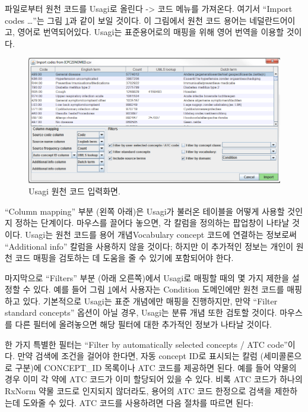 \documentclass[10.5pt]{book}
\theoremstyle{definition}
\theoremstyle{definition}
\theoremstyle{definition}
\theoremstyle{remark}
\begin{document}
파일로부터 원천 코드를 Usagi로 올린다 -\textgreater{} 코드 메뉴를
가져온다. 여기서 ``Import codes \ldots{}''는 그림
\ref{fig:usagiImport}과 같이 보일 것이다. 이 그림에서 원천 코드 용어는
네덜란드어이고, 영어로 번역되어있다. Usagi는 표준용어로의 매핑을 위해
영어 번역을 이용할 것이다.

\begin{figure}

{\centering \includegraphics[width=1\linewidth]{images/ExtractTransformLoad/usagiImport} 

}

\caption{Usagi 원천 코드 입력화면.}\label{fig:usagiImport}
\end{figure}

``Column mapping'' 부분 (왼쪽 아래)은 Usagi가 불러온 테이블을 어떻게
사용할 것인지 정하는 단계이다. 마우스를 끌어다 놓으면, 각 칼럼을
정의하는 팝업창이 나타날 것이다. Usagi는 원천 코드를 용어 개념Vocabulary
concept 코드에 연결하는 정보로써 ``Additional info'' 칼럼을 사용하지
않을 것이다; 하지만 이 추가적인 정보는 개인이 원천 코드 매핑을 검토하는
데 도움을 줄 수 있기에 포함되어야 한다.

마지막으로 ``Filters'' 부분 (아래 오른쪽)에서 Usagi로 매핑할 때의 몇
가지 제한을 설정할 수 있다. 예를 들어 그림 \ref{fig:usagiImport}에서
사용자는 Condition 도메인에만 원천 코드를 매핑하고 있다. 기본적으로
Usagi는 표준 개념에만 매핑을 진행하지만, 만약 ``Filter standard
concepts'' 옵션이 아닐 경우, Usagi는 분류 개념 또한 검토할 것이다.
마우스를 다른 필터에 올려놓으면 해당 필터에 대한 추가적인 정보가 나타날
것이다.

한 가지 특별한 필터는 ``Filter by automatically selected concepts / ATC
code''이다. 만약 검색에 조건을 걸어야 한다면, 자동 concept ID로 표시되는
칼럼 (세미콜론으로 구분)에 CONCEPT\_ID 목록이나 ATC 코드를 제공하면
된다. 예를 들어 약물의 경우 이미 각 약에 ATC 코드가 이미 할당되어 있을
수 있다. 비록 ATC 코드가 하나의 RxNorm 약물 코드로 인지되지 않더라도,
용어의 ATC 코드 한정으로 검색을 제한하는데 도와줄 수 있다. ATC 코드를
사용하려면 다음 절차를 따르면 된다:
\end{document}
